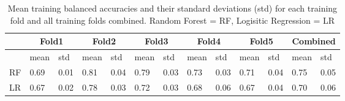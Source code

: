 \begin{table}
\centering
\begin{tabular}{lllllllllllll}
 &
  \multicolumn{2}{c}{Fold1} &
  \multicolumn{2}{c}{Fold2} &
  \multicolumn{2}{c}{Fold3} &
  \multicolumn{2}{c}{Fold4} &
  \multicolumn{2}{c}{Fold5} &
  \multicolumn{2}{c}{Combined} \\ \hline
   & mean & std  & mean & std  & mean & std  & mean & std  & mean & std  & mean 
& std  \\ \hline
RF & 0.69 & 0.01 & 0.81 & 0.04 & 0.79 & 0.03 & 0.73 & 0.03 & 0.71 & 0.04 & 0.75 
& 0.05 \\
LR & 0.67 & 0.02 & 0.78 & 0.03 & 0.72 & 0.03 & 0.68 & 0.06 & 0.67 & 0.04 & 0.70 
& 0.06
\end{tabular}
\caption{Mean training balanced accuracies and their standard deviations (std) 
for each training fold and all training folds combined. Random Forest = RF, 
Logisitic Regression = LR }
\label{tab:training-b_acc}
\end{table}
